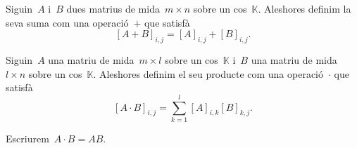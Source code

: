 \documentclass[../algebra-lineal.tex]{subfiles}
\begin{document}
    \begin{definition}
        \label{def:suma-de-matrius}
        Siguin~\(A\) i~\(B\) dues matrius de mida~\(m\times n\) sobre un cos~\(\mathbb{K}\).
        Aleshores definim la seva suma com una operació~\(+\) que satisfà
        \[
            [A+B]_{i,j}=[A]_{i,j}+[B]_{i,j}.
        \]
    \end{definition}
    \begin{definition}
        \label{def:producte-de-matrius}
        Siguin~\(A\) una matriu de mida~\(m\times l\) sobre un cos~\(\mathbb{K}\) i~\(B\) una matriu de mida~\(l\times n\) sobre un cos~\(\mathbb{K}\).
        Aleshores definim el seu producte com una operació~\(\cdot\) que satisfà
        \[
            [A\cdot B]_{i,j}=\sum_{k=1}^{l}[A]_{i,k}[B]_{k,j}.
        \]

        Escriurem~\(A\cdot B=AB\).
    \end{definition}
\end{document}
